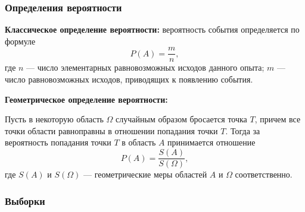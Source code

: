 \documentclass[a4paper]{article}
\newcommand{\key}[1]{{\bfseries\color{Medium} #1}}
\begin{document}
            \subsubsection{Определения вероятности}

                \key{Классическое определение вероятности:} \newline                
                вероятность события определяется по формуле
                \begin{equation*}
                    P(A) = \frac{m}{n} ,
                \end{equation*}
                где \newline
                $n$ --- число элементарных равновозможных исходов данного опыта; \newline
                $m$ --- число равновозможных исходов, приводящих к появлению события.

                \key{Геометрическое определение вероятности:}


                Пусть в некоторую область $\Omega$ случайным образом бросается точка $T$, причем все точки области равноправны в отношении попадания точки $T$. Тогда за вероятность попадания точки $T$ в область $A$ принимается отношение
                \begin{equation*}
                    P(A) = \frac{S(A)}{S(\Omega)} ,
                \end{equation*}
                где $S(A)$ и $S(\Omega)$ --- геометрические меры областей $A$ и $\Omega$ соответственно.

            \subsubsection{Выборки}
\end{document}
